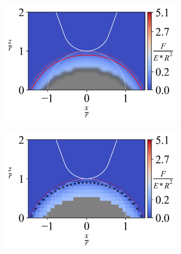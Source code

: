 \begin{figure}[H]
    
    \begin{subfigure}{0.32\textwidth}
        \centering
        \caption{\label{fig: All-Hemisphere-ContourPlot-3}}
        \includegraphics[width=1\linewidth]{Figures/Hemisphere-ContourPlot-3.png}
    \end{subfigure}
    \hfill
    \begin{subfigure}{0.32\textwidth}
        \centering
        \caption{\label{fig: All-Hemisphere-ContourPlotNI-3}}
        \includegraphics[width=1\linewidth]{Figures/Hemisphere-ContourPlotNI-3.png}
    \end{subfigure}
    \hfill
    \begin{subfigure}{0.32\textwidth}
        \centering
        \caption{\label{fig: All-Hemisphere-LineContour-3}}

\end{subfigure}
\end{figure}
